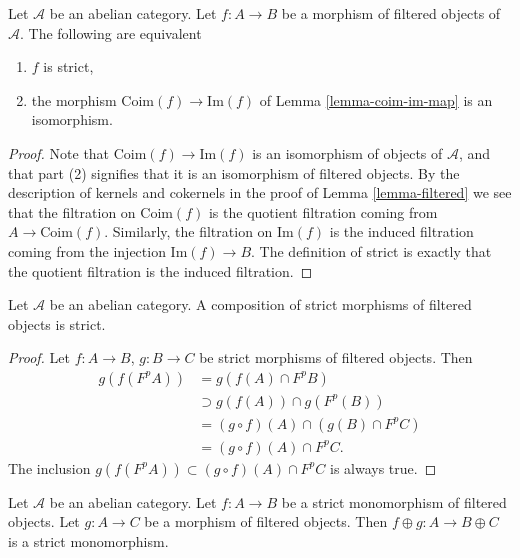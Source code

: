 \begin{lemma}
\label{lemma-characterize-strict-general}
Let $\mathcal{A}$ be an abelian category.
Let $f : A \to B$ be a morphism of filtered objects of $\mathcal{A}$.
The following are equivalent
\begin{enumerate}
\item $f$ is strict,
\item the morphism $\text{Coim}(f) \to \text{Im}(f)$ of
Lemma \ref{lemma-coim-im-map}
is an isomorphism.
\end{enumerate}
\end{lemma}

\begin{proof}
Note that $\text{Coim}(f) \to \text{Im}(f)$ is an isomorphism of
objects of $\mathcal{A}$, and that part (2) signifies that it is
an isomorphism of filtered objects.
By the description of kernels and cokernels in the proof of
Lemma \ref{lemma-filtered}
we see that the filtration on $\text{Coim}(f)$ is the
quotient filtration coming from $A \to \text{Coim}(f)$.
Similarly, the filtration on $\text{Im}(f)$ is the induced
filtration coming from the injection $\text{Im}(f) \to B$.
The definition of strict is exactly that the quotient filtration
is the induced filtration.
\end{proof}

\begin{lemma}
\label{lemma-composition-strict}
Let $\mathcal{A}$ be an abelian category.
A composition of strict morphisms of filtered objects is strict.
\end{lemma}

\begin{proof}
Let $f : A \to B$, $g : B \to C$ be strict morphisms of filtered objects.
Then
\begin{align*}
g(f(F^pA)) & = g(f(A) \cap F^pB) \\
& \supset g(f(A)) \cap g(F^p(B)) \\
& = (g \circ f)(A) \cap (g(B) \cap F^pC) \\
& = (g \circ f)(A) \cap F^pC.
\end{align*}
The inclusion $g(f(F^pA)) \subset (g \circ f)(A) \cap F^pC$ is
always true.
\end{proof}

\begin{lemma}
\label{lemma-add-summand-strict-monomorphism}
Let $\mathcal{A}$ be an abelian category.
Let $f : A \to B$ be a strict monomorphism of filtered objects.
Let $g : A \to C$ be a morphism of filtered objects.
Then $f \oplus g : A \to B \oplus C$ is a strict monomorphism.
\end{lemma}

